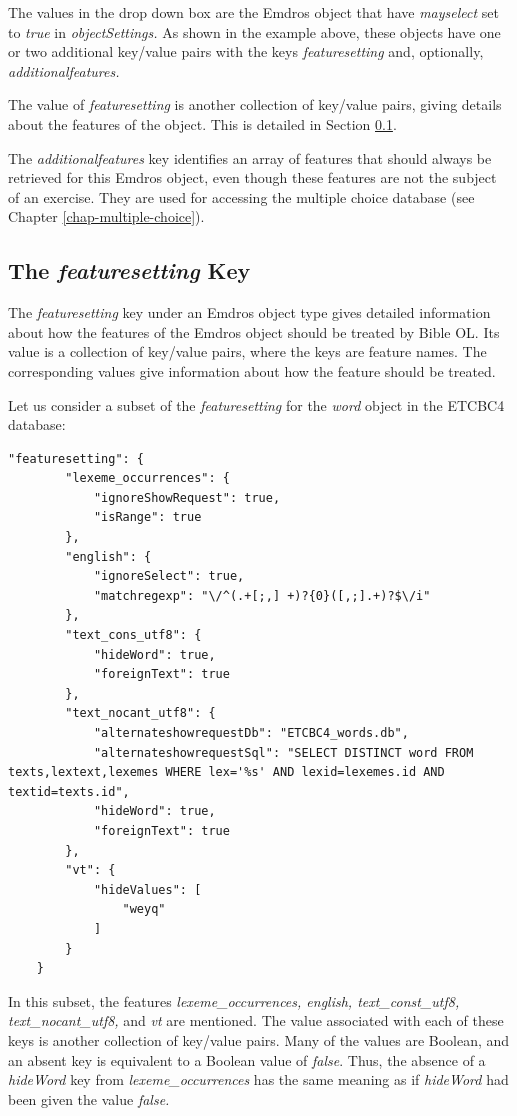 \documentclass[11pt,oneside,a4paper]{memoir}
\begin{document}
The values in the drop down box are the Emdros object that have \emph{mayselect} set to \emph{true}
in \emph{objectSettings.} As shown in the example above, these objects have one or two additional
key/value pairs with the keys \emph{featuresetting} and, optionally, \emph{additionalfeatures.}

The value of \emph{featuresetting} is another collection of key/value pairs, giving
details about the features of the object. This is detailed in Section \ref{sec-featuresetting}.

The \emph{additionalfeatures} key identifies an array of features that should always be retrieved
for this Emdros object, even though these features are not the subject of an exercise. They are used
for accessing the multiple choice database (see Chapter \ref{chap-multiple-choice}).

\subsection{The \emph{featuresetting} Key}\label{sec-featuresetting}

The \emph{featuresetting} key under an Emdros object type gives detailed information about how the
features of the Emdros object should be treated by Bible OL. Its value is a collection of key/value
pairs, where the keys are feature names. The corresponding values give
information about how the feature should be treated.

Let us consider a subset of the \emph{featuresetting} for the \emph{word} object in the ETCBC4
database:

\begin{lstlisting}[escapechar=\#]
    "featuresetting": {
        "lexeme_occurrences": {
            "ignoreShowRequest": true,
            "isRange": true
        },
        "english": {
            "ignoreSelect": true,
            "matchregexp": "\/^(.+[;,] +)?{0}([,;].+)?$\/i"
        },
        "text_cons_utf8": {
            "hideWord": true,
            "foreignText": true
        },
        "text_nocant_utf8": {
            "alternateshowrequestDb": "ETCBC4_words.db",
            "alternateshowrequestSql": "SELECT DISTINCT word FROM texts,lextext,lexemes WHERE lex='%s' AND lexid=lexemes.id AND textid=texts.id",
            "hideWord": true,
            "foreignText": true
        },
        "vt": {
            "hideValues": [
                "weyq"
            ]
        }
    }
\end{lstlisting}

In this subset, the features \emph{lexeme\_occurrences, english, text\_const\_utf8,
  text\_nocant\_utf8,} and \emph{vt} are mentioned. The value associated with each of these keys is
another collection of key/value pairs. Many of the values are Boolean, and an absent key is
equivalent to a Boolean value of \emph{false}. Thus, the absence of a \emph{hideWord} key from
\emph{lexeme\_occurrences} has the same meaning as if \emph{hideWord} had been given the value
\emph{false.}
\end{document}
